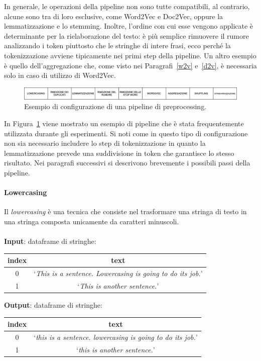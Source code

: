 \documentclass[12pt]{report}
\theoremstyle{definition}
\begin{document}
In generale, le operazioni della pipeline non sono tutte compatibili, al contrario, alcune sono tra di loro esclusive, come Word2Vec e Doc2Vec, oppure la lemmatizzazione e lo stemming.
Inoltre, l'ordine con cui esse vengono applicate è determinante per la rielaborazione del testo: è più semplice rimuovere il rumore analizzando i token piuttosto che le stringhe di intere frasi, ecco perché la tokenizzazione avviene tipicamente nei primi step della pipeline. Un altro esempio è quello dell'aggregazione che, come visto nei Paragrafi~\ref{w2v} e~\ref{d2v}, è necessaria solo in caso di utilizzo di Word2Vec.
\begin{figure}
    \centering
    \includegraphics[scale=0.4]{images/pipeline.png}
    \caption{Esempio di configurazione di una pipeline di preprocessing.}
    \label{pipeline}
\end{figure}
In Figura~\ref{pipeline} viene mostrato un esempio di pipeline che è stata frequentemente utilizzata durante gli esperimenti. Si noti come in questo tipo di configurazione non sia necessario includere lo step di tokenizzazione in quanto la lemmatizzazione prevede una suddivisione in token che garantisce lo stesso risultato.
Nei paragrafi successivi si descrivono brevemente i possibili passi della pipeline.

\paragraph{Lowercasing}
Il \textit{lowercasing} è una tecnica che consiste nel trasformare una stringa di testo in una stringa composta unicamente da caratteri minuscoli.
\\
\\
\textbf{Input}: dataframe di stringhe:
\begin{center}
    \begin{tabular}{|c|c|}
    \hline
    \textbf{index} & \textbf{text} \\
    \hline
         0 & `\textit{This is a sentence. Lowercasing is going to do its job.}'\\
         1 & `\textit{This is another sentence.}'\\
    \hline
    \end{tabular}
\end{center}
\textbf{Output}: dataframe di stringhe:
\begin{center}
    \begin{tabular}{|c|c|}
    \hline
    \textbf{index} & \textbf{text} \\
    \hline
         0 & `\textit{this is a sentence. lowercasing is going to do its job.}'\\
         1 & `\textit{this is another sentence.}'\\
    \hline
    \end{tabular}
\end{center}
\end{document}
